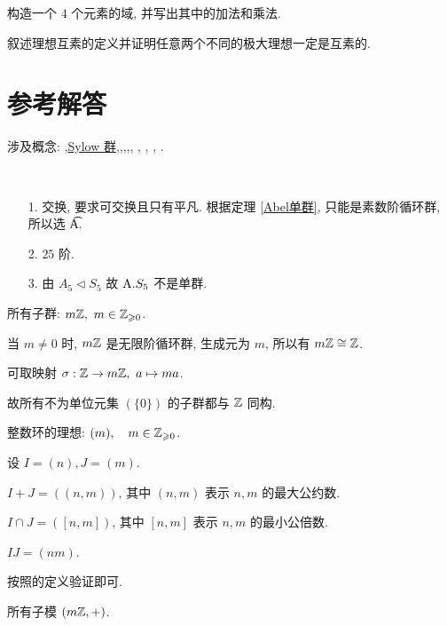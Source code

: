 \problem[题目 8] 构造一个 $4$ 个元素的域, 并写出其中的加法和乘法.

\problem[题目 9] 叙述理想互素的定义并证明任意两个不同的极大理想一定是互素的.

\newpage

\section*{参考解答}

涉及概念: ,\hyperref[Sylow1]{Sylow 群},,,,, , , , .

\problem[题目1]
\begin{solution}\

	\begin{itemize}
		\item[1.] 交换, 要求可交换且只有平凡. 根据定理 \ref{Abel单群}, 只能是素数阶循环群, 所以选 \t A.
		\item[2.] $25$ 阶.
		\item[3.] 由 $A_5\lhd S_5$ 故 $\text {A}. S_5$ 不是单群.
	\end{itemize}

\end{solution}

\problem[题目2]
\begin{solution}
	所有子群: $m\mathbb Z,\ m\in \mathbb Z_{\geqslant0}$.

	当 $m\neq 0$ 时, $m\mathbb Z$ 是无限阶循环群, 生成元为 $m$, 所以有 $m\mathbb Z\cong \mathbb Z$.

	可取映射 $\sigma:\mathbb Z\to m\mathbb Z,\ a\mapsto ma$.

	故所有不为单位元集 $(\{0\})$ 的子群都与 $\mathbb Z$ 同构.
\end{solution}

\problem[题目 3]
\begin{solution}
	整数环的理想: $(m),\quad m\in \mathbb Z_{\geqslant 0}$.

	设 $I=(n),J=(m)$.

	$I+J=((n,m))$, 其中 $(n,m)$ 表示 $n,m$ 的最大公约数.

	$I\cap J=([n,m])$, 其中 $[n,m]$ 表示 $n,m$ 的最小公倍数.

	$IJ=(nm)$.
\end{solution}

\problem[题目 4]

\begin{solution}
	按照的定义验证即可.
	
	所有子模 $(m\mathbb Z,+)$.
\end{solution}

